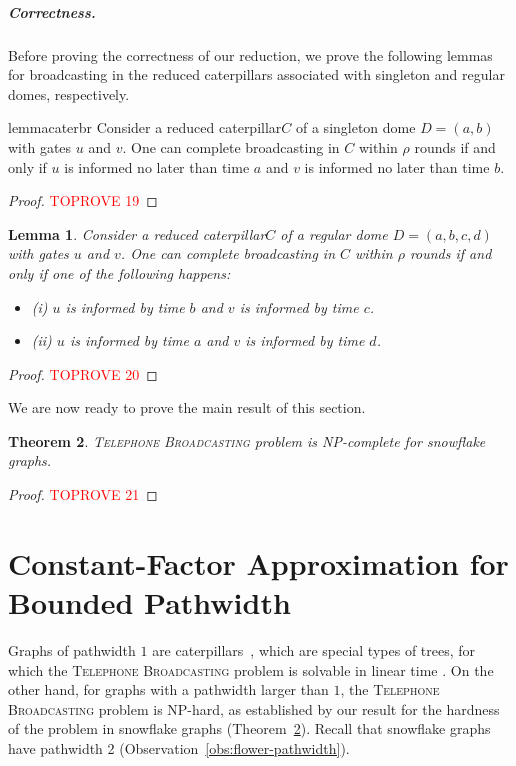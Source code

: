 \documentclass[letterpaper,11pt]{article}
\newtheorem{theorem}{Theorem}[section]
\newtheorem{lemma}[theorem]{Lemma}
\newcommand{\flower}{snowflake\xspace}
\newcommand{\telebr}{\textsc{Telephone Broadcasting}\xspace}
\newcommand{\cater}{reduced caterpillar\xspace}
\begin{document}
\subparagraph*{Correctness.}
Before proving the correctness of our reduction, we prove the following lemmas for broadcasting in the reduced caterpillars associated with singleton and regular domes, respectively. 

\begin{restatable}{lemma}{caterbr}\label{lemma:broudguess:singletondomeiff}
Consider a \cater $C$ of a singleton dome $D=(a,b)$ with gates $u$ and $v$. One can complete broadcasting in $C$ within $\rho$ rounds if and only if $u$ is informed no later than time $a$ and $v$ is informed no later than time $b$.
\end{restatable}
\begin{proof}\textcolor{red}{TOPROVE 19}\end{proof}



\begin{lemma}\label{lemma:broudguess:regulardomeiff}
    Consider a \cater $C$ of a regular dome $D=(a,b,c,d)$ with gates $u$ and $v$. One can complete broadcasting in $C$ within $\rho$ rounds if and only if one of the following happens: 
    \begin{itemize}
        \item  (i) $u$ is informed by time $b$ and $v$ is informed by time $c$. 
        \item (ii) $u$ is informed by time $a$ and $v$ is informed by time $d$.
    \end{itemize}
   
\end{lemma}

\begin{proof}\textcolor{red}{TOPROVE 20}\end{proof}

We are now ready to prove the main result of this section.

\begin{theorem} \label{thm:hardness-flower}
    \telebr problem is NP-complete for \flower graphs.
\end{theorem}
\begin{proof}\textcolor{red}{TOPROVE 21}\end{proof}
  \section{Constant-Factor Approximation for Bounded Pathwidth}
\label{sec:pathwidth-approx}

Graphs of pathwidth $1$ are caterpillars~\cite{ProskurowskiT99}, which are special types of trees, for which the \telebr problem is solvable in linear time \cite{fraigniaud2002polynomial}. On the other hand, for graphs with a pathwidth larger than $1$, the \telebr problem is NP-hard, as established by our result for the hardness of the problem in \flower graphs (Theorem~\ref{thm:hardness-flower}). Recall that \flower graphs have pathwidth 2 (Observation~\ref{obs:flower-pathwidth}). 
\end{document}
